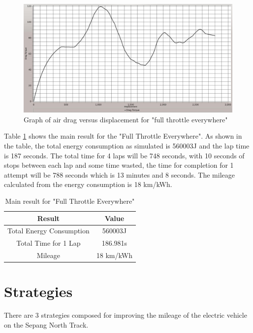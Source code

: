 \begin{figure}[htb]
	\centering
	\includegraphics[width=6in]{images/0_3.jpg}
	\caption{Graph of air drag versus displacement for "full throttle everywhere"}
	\label{im:0_3}
\end{figure}

Table \ref{tb:fullThrottleResult} shows the main result for the "Full Throttle Everywhere". As shown in the table, the total energy consumption as simulated is 560003J and the lap time is 187 seconds. The total time for 4 laps will be 748 seconds, with 10 seconds of stops between each lap and some time wasted, the time for completion for 1 attempt will be 788 seconds which is 13 minutes and 8 seconds. The mileage calculated from the energy consumption is 18 km/kWh. 

\begin{table}[htbp]
\begin{center}
\begin{tabular}{|c|c|}
\hline
\textbf{Result} & \textbf{Value} \\ \hline
Total Energy Consumption & 560003J \\ \hline
Total Time for 1 Lap & 186.981s \\ \hline
Mileage & 18 km/kWh \\ \hline
\end{tabular}
\end{center}
\caption{Main result for "Full Throttle Everywhere" }
\label{tb:fullThrottleResult}
\end{table} \clearpage

\section{Strategies}
There are 3 strategies composed for improving the mileage of the electric vehicle on the Sepang North Track.

